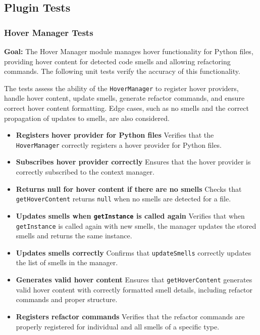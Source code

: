 \documentclass[12pt, titlepage]{article}
\begin{document}
\subsection{Plugin Tests}


\subsubsection{Hover Manager Tests}

\textbf{Goal:} The Hover Manager module manages hover functionality for Python files, providing hover content for detected code smells and allowing refactoring commands. The following unit tests verify the accuracy of this functionality.

The tests assess the ability of the \texttt{HoverManager} to register hover providers, handle hover content, update smells, generate refactor commands, and ensure correct hover content formatting. Edge cases, such as no smells and the correct propagation of updates to smells, are also considered.

\begin{itemize}
\item \textbf{Registers hover provider for Python files} \newline
Verifies that the \texttt{HoverManager} correctly registers a hover provider for Python files.

\item \textbf{Subscribes hover provider correctly} \newline
Ensures that the hover provider is correctly subscribed to the context manager.

\item \textbf{Returns null for hover content if there are no smells} \newline
Checks that \texttt{getHoverContent} returns \texttt{null} when no smells are detected for a file.

\item \textbf{Updates smells when \texttt{getInstance} is called again} \newline
Verifies that when \texttt{getInstance} is called again with new smells, the manager updates the stored smells and returns the same instance.

\item \textbf{Updates smells correctly} \newline
Confirms that \texttt{updateSmells} correctly updates the list of smells in the manager.

\item \textbf{Generates valid hover content} \newline
Ensures that \texttt{getHoverContent} generates valid hover content with correctly formatted smell details, including refactor commands and proper structure.

\item \textbf{Registers refactor commands} \newline
Verifies that the refactor commands are properly registered for individual and all smells of a specific type.
\end{itemize}
\end{document}

